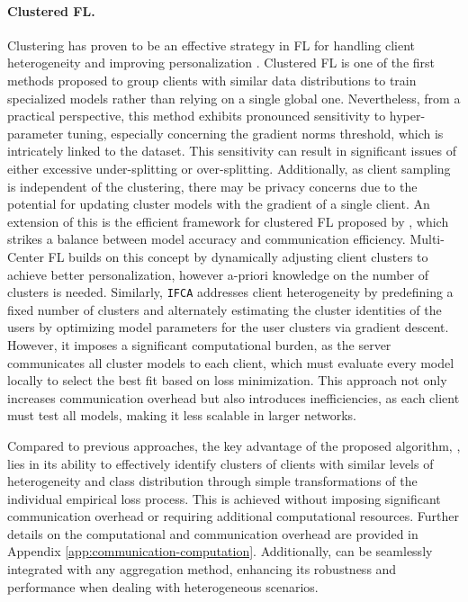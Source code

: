 \paragraph{Clustered FL.} Clustering has proven to be an effective strategy in FL for handling client heterogeneity and improving personalization \citep{huang2022collaboration, duan2021fedgroup, briggs2020federated, Caldarola_2021_CVPR, ye2023personalized}. Clustered FL \citep{sattler2020clustered} is one of the first methods proposed to group clients with similar data distributions to train specialized models rather than relying on a single global one. Nevertheless, from a practical perspective, this method exhibits pronounced sensitivity to hyper-parameter tuning, especially concerning the gradient norms threshold, which is intricately linked to the dataset. This sensitivity can result in significant issues of either excessive under-splitting or over-splitting. Additionally, as client sampling is independent of the clustering, there may be privacy concerns due to the potential for updating cluster models with the gradient of a single client. An extension of this is the efficient framework for clustered FL proposed by \citep{ghosh2020efficient}, which strikes a balance between model accuracy and communication efficiency. Multi-Center FL \citep{long2023multi} builds on this concept by dynamically adjusting client clusters to achieve better personalization, however a-priori knowledge on the number of clusters is needed. Similarly, \texttt{IFCA} \citep{ghosh2020efficient} addresses client heterogeneity by predefining a fixed number of clusters and alternately estimating the cluster identities of the users by optimizing model parameters for the user clusters via gradient descent. However, it imposes a significant computational burden, as the server communicates all cluster models to each client, which must evaluate every model locally to select the best fit based on loss minimization. This approach not only increases communication overhead but also introduces inefficiencies, as each client must test all models, making it less scalable in larger networks. 

Compared to previous approaches, the key advantage of the proposed algorithm, \shortname, lies in its ability to effectively identify clusters of clients with similar levels of heterogeneity and class distribution through simple transformations of the individual empirical loss process. This is achieved without imposing significant communication overhead or requiring additional computational resources. Further details on the computational and communication overhead are provided in Appendix \ref{app:communication-computation}. Additionally, \shortname can be seamlessly integrated with any aggregation method, enhancing its robustness and performance when dealing with heterogeneous scenarios. 

